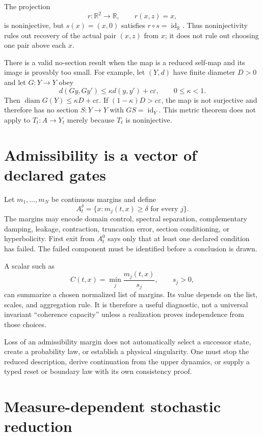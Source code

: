 \documentclass[11pt]{article}
\begin{document}
\begin{example}
The projection
\[
  r:\mathbb R^2\to\mathbb R,
  \qquad r(x,z)=x,
\]
is noninjective, but $s(x)=(x,0)$ satisfies
$r\circ s=\operatorname{id}_{\mathbb R}$.  Thus noninjectivity rules out
recovery of the actual pair $(x,z)$ from $x$; it does not rule out choosing one
pair above each $x$.
\end{example}

There is a valid no-section result when the map is a reduced self-map and its
image is provably too small.  For example, let $(Y,d)$ have finite diameter
$D>0$ and let $G:Y\to Y$ obey
\[
  d(Gy,Gy')\leq \kappa d(y,y')+c\varepsilon,
  \qquad 0\leq\kappa<1.
\]
Then $\operatorname{diam}G(Y)\leq\kappa D+c\varepsilon$.  If
$(1-\kappa)D>c\varepsilon$, the map is not surjective and therefore has no
section $S:Y\to Y$ with $GS=\operatorname{id}_Y$.  This metric theorem does
not apply to $T_t:A\to Y_t$ merely because $T_t$ is noninjective.

\section{Admissibility is a vector of declared gates}\label{sec:admissibility}

Let $m_1,\ldots,m_N$ be continuous margins and define
\[
  A_t^\delta
  =\{x:m_j(t,x)\geq\delta\text{ for every }j\}.
\]
The margins may encode domain control, spectral separation, complementary
damping, leakage, contraction, truncation error, section conditioning, or
hyperbolicity.  First exit from $A_t^0$ says only that at least one declared
condition has failed.  The failed component must be identified before a
conclusion is drawn.

A scalar such as
\[
  C(t,x)=\min_j \frac{m_j(t,x)}{s_j},
  \qquad s_j>0,
\]
can summarize a chosen normalized list of margins.  Its value depends on the
list, scales, and aggregation rule.  It is therefore a useful diagnostic, not
a universal invariant ``coherence capacity'' unless a realization proves
independence from those choices.

Loss of an admissibility margin does not automatically select a successor
state, create a probability law, or establish a physical singularity.  One
must stop the reduced description, derive continuation from the upper
dynamics, or supply a typed reset or boundary law with its own consistency
proof.

\section{Measure-dependent stochastic reduction}
\end{document}
